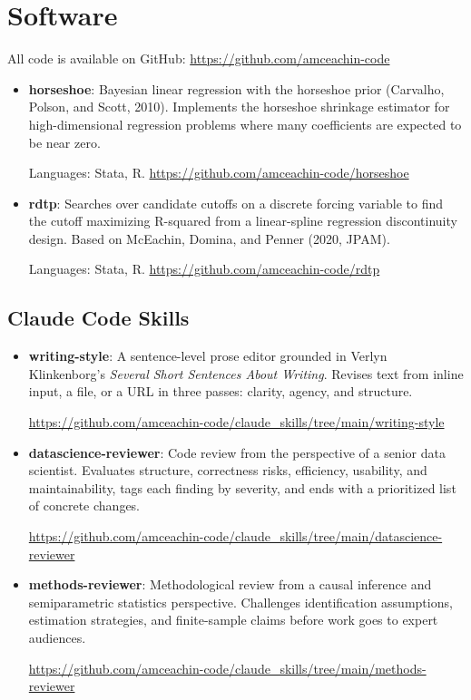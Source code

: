 \documentclass[11pt, letterpaper]{article}
\begin{document}
\section{Software}
All code is available on GitHub: \url{https://github.com/amceachin-code}
\begin{itemize}
  \item \textbf{horseshoe}: Bayesian linear regression with the horseshoe prior (Carvalho, Polson, and Scott, 2010). Implements the horseshoe shrinkage estimator for high-dimensional regression problems where many coefficients are expected to be near zero.

  Languages: Stata, R.
\url{https://github.com/amceachin-code/horseshoe}
  \item \textbf{rdtp}: Searches over candidate cutoffs on a discrete forcing variable to find the cutoff maximizing R-squared from a linear-spline regression discontinuity design. Based on McEachin, Domina, and Penner (2020, JPAM).

  Languages: Stata, R.
\url{https://github.com/amceachin-code/rdtp}
\end{itemize}

\subsection{Claude Code Skills}
\begin{itemize}
  \item \textbf{writing-style}: A sentence-level prose editor grounded in Verlyn Klinkenborg's \textit{Several Short Sentences About Writing}. Revises text from inline input, a file, or a URL in three passes: clarity, agency, and structure.

\url{https://github.com/amceachin-code/claude_skills/tree/main/writing-style}
  \item \textbf{datascience-reviewer}: Code review from the perspective of a senior data scientist. Evaluates structure, correctness risks, efficiency, usability, and maintainability, tags each finding by severity, and ends with a prioritized list of concrete changes.

\url{https://github.com/amceachin-code/claude_skills/tree/main/datascience-reviewer}
  \item \textbf{methods-reviewer}: Methodological review from a causal inference and semiparametric statistics perspective. Challenges identification assumptions, estimation strategies, and finite-sample claims before work goes to expert audiences.

\url{https://github.com/amceachin-code/claude_skills/tree/main/methods-reviewer}
\end{itemize}
\end{document}
